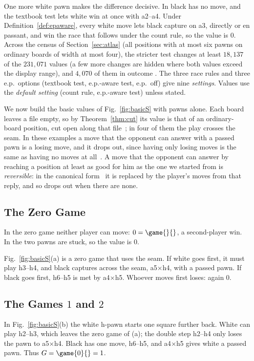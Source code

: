 One more white pawn makes the difference decisive. In  black has no move, and the textbook
test lets white win at once with a2--a4. Under Definition~\ref{def:epaware}, every white move lets black capture
on a3, directly or en passant, and win the race that follows under the count rule, so the value is $0$. Across
the census of Section~\ref{sec:atlas} (all positions with at most six pawns on ordinary boards of width at
most four), the stricter test changes at least $18{,}137$ of the $231{,}071$ values (a few more changes are hidden
where both values exceed the display range), and $4{,}070$ of them in outcome . The three race rules and three e.p.\ options (textbook test, e.p.-aware test, e.p.\ off) give nine
\emph{settings}. Values use the \emph{default setting} (count rule, e.p.-aware test) unless
stated.

We now build the basic values of Fig.~\ref{fig:basicS} with pawns alone. Each board leaves a file empty, so by
Theorem~\ref{thm:cut} its value is that of an ordinary-board position, cut open along that
file~\cite{Elkies1996,WuYuLandry2010}; in four of them the play crosses the seam. In these examples a move that the
opponent can answer with a passed pawn is a losing move, and it drops out, since having only losing moves is
the same as having no moves at all~\cite{WinningWays,WuYuLandry2010}. A move that the opponent can answer by reaching a
position at least as good for him as the one we started from is \emph{reversible}: in the canonical
form~\cite{WinningWays} it is replaced by the player's moves from that reply, and so drops out when there are
none.

\subsection{The Zero Game}
In the zero game neither player can move: $0=\game{}{}$, a second-player win. In
 the two pawns are stuck, so the value is $0$.

Fig.~\ref{fig:basicS}(a) is a zero game that uses the seam. If white goes first, it must play h3--h4, and black
captures across the seam, a5$\times$h4, with a passed pawn. If black goes first, h6--h5 is met by a4$\times$h5.
Whoever moves first loses: again $0$.

\subsection{The Games \texorpdfstring{$1$}{1} and \texorpdfstring{$2$}{2}}
In Fig.~\ref{fig:basicS}(b) the white h-pawn starts one square further back. White can play h2--h3, which leaves
the zero game of (a); the double step h2--h4 only loses the pawn to a5$\times$h4. Black has one move, h6--h5,
and a4$\times$h5 gives white a passed pawn. Thus $G=\game{0}{}=1$.

